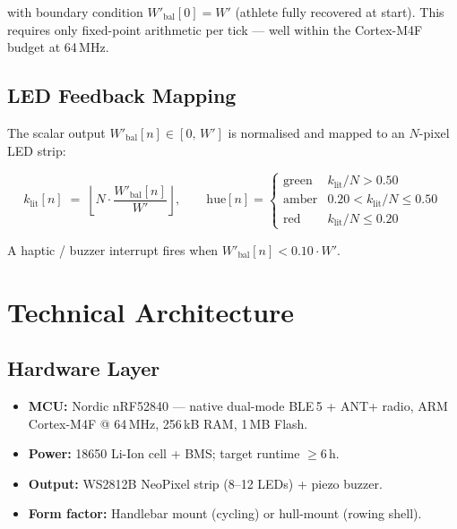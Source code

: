 \documentclass[11pt, letterpaper]{article}
\begin{document}
with boundary condition $W'_{\mathrm{bal}}[0] = W'$ (athlete fully recovered at start).
This requires only fixed-point arithmetic per tick --- well within the Cortex-M4F budget
at 64\,MHz.

\subsection{LED Feedback Mapping}

The scalar output $W'_{\mathrm{bal}}[n] \in [0,\,W']$ is normalised and mapped to an
$N$-pixel LED strip:

\begin{equation}
  k_{\mathrm{lit}}[n]
  \;=\;
  \left\lfloor N \cdot \frac{W'_{\mathrm{bal}}[n]}{W'} \right\rfloor,
  \qquad
  \mathrm{hue}[n] =
  \begin{cases}
    \text{green} & k_{\mathrm{lit}}/N > 0.50 \\
    \text{amber} & 0.20 < k_{\mathrm{lit}}/N \leq 0.50 \\
    \text{red}   & k_{\mathrm{lit}}/N \leq 0.20
  \end{cases}
  \label{eq:led}
\end{equation}

A haptic / buzzer interrupt fires when $W'_{\mathrm{bal}}[n] < 0.10\cdot W'$.

\section{Technical Architecture}

\subsection{Hardware Layer}
\begin{itemize}
  \item \textbf{MCU:} Nordic nRF52840 --- native dual-mode BLE\,5 + ANT+ radio,
    ARM Cortex-M4F @ 64\,MHz, 256\,kB RAM, 1\,MB Flash.
  \item \textbf{Power:} 18650 Li-Ion cell + BMS; target runtime $\geq 6$\,h.
  \item \textbf{Output:} WS2812B NeoPixel strip (8--12 LEDs) + piezo buzzer.
  \item \textbf{Form factor:} Handlebar mount (cycling) or hull-mount (rowing shell).
\end{itemize}
\end{document}
